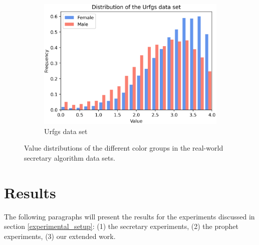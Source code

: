 \begin{figure}[h!]
\begin{subfigure}[t]{0.32\textwidth}
        \includegraphics[width=1\textwidth]{media/Images_plots/dataset_distribution_Urfgs.png}
        \caption{Urfgs data set}
        \label{distribution_ufrgs}
    \end{subfigure}
    \caption{Value distributions of the different color groups in the real-world secretary algorithm data sets.}
    \label{fig:distributions}
\end{figure}


\section{Results}
\label{sec:results}
The following paragraphs will present the results for the experiments discussed in section \ref{experimental_setup}: (1) the secretary experiments, (2) the prophet experiments, (3) our extended work. \\

